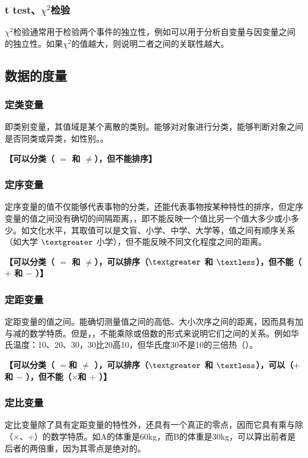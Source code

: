 \subsubsection{t test、$\chi^2$检验}
$\chi^2$检验通常用于检验两个事件的独立性，例如可以用于分析自变量与因变量之间的独立性。如果$\chi^2$的值越大，则说明二者之间的关联性越大。

\subsection{数据的度量}
\subsubsection{定类变量}
即类别变量，其值域是某个离散的类别。能够对对象进行分类，能够判断对象之间是否同类或异类，如性别。。

\textbf{【可以分类（ $=$ 和 $\neq$），但不能排序】}

\subsubsection{定序变量}
定序变量的值不仅能够代表事物的分类，还能代表事物按某种特性的排序，但定序变量的值之间没有确切的间隔距离，，即不能反映一个值比另一个值大多少或小多少。如文化水平，其取值可以是文盲、小学、中学、大学等，值之间有顺序关系（如大学 $\textgreater$ 小学），但不能反映不同文化程度之间的距离。

\textbf{【可以分类（ $=$ 和 $\neq$），可以排序（$\textgreater$ 和 $\textless$），但不能（$+$ 和 $-$ ）】}

\subsubsection{定距变量}
定距变量的值之间。能确切测量值之间的高低、大小次序之间的距离，因而具有加与减的数学特质。但是，，不能乘除或倍数的形式来说明它们之间的关系。例如华氏温度：10、20、30，30比20高10，但华氏度30不是10的三倍热（）。

\textbf{【可以分类（ $=$和 $\neq$ ），可以排序（$\textgreater$ 和 $\textless$），可以（$+$ 和 $-$ ），但不能（$\times$和 $\div$ ）】}

\subsubsection{定比变量}
定比变量除了具有定距变量的特性外，还具有一个真正的零点，因而它具有乘与除（×、÷）的数学特质。如A的体重是60kg，而B的体重是30kg，可以算出前者是后者的两倍重，因为其零点是绝对的。

